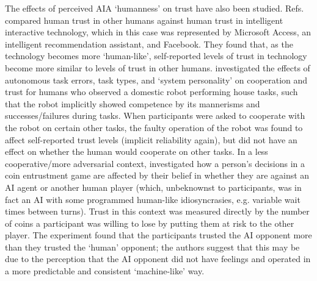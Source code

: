 The effects of perceived AIA `humanness' on trust have also been studied. 
Refs. \cite{Tripp2011-rx} compared human trust in other humans against human trust in intelligent interactive technology, which in this case was represented by Microsoft Access, an intelligent recommendation assistant, and Facebook. 
They found that, as the technology becomes more `human-like', self-reported levels of trust in technology become more similar to levels of trust in other humans. 
\citet{Salem2015-md} investigated the effects of autonomous task errors, task types, and `system personality' on cooperation and trust for humans who observed a domestic robot performing house tasks, such that the robot implicitly showed competence by its mannerisms and successes/failures during tasks. When participants were asked to cooperate with the robot on certain other tasks, the faulty operation of the robot was found to affect self-reported trust levels (implicit reliability again), but did not have an effect on whether the human would cooperate on other tasks. %
In a less cooperative/more adversarial context, \citet{Wu2016-ei} investigated how a person's decisions in a coin entrustment game are affected by their belief in whether they are against an AI agent or another human player (which, unbeknownst to participants, was in fact an AI with some programmed human-like idiosyncrasies, e.g. variable wait times between turns). 
Trust in this context was measured directly by the number of coins a participant was willing to lose by putting them at risk to the other player. The experiment found that the participants trusted the AI opponent more than they trusted the `human' opponent; the authors suggest that this may be due to the perception that the AI opponent did not have feelings and operated in a more predictable and consistent `machine-like' way. 

